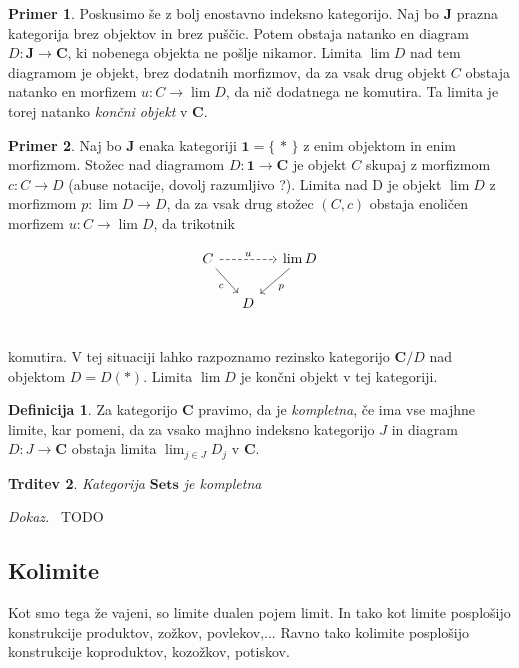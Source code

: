 \documentclass[12pt,a4paper]{book}
\theoremstyle{definition}
\newtheorem{definicija}{Definicija}[chapter]
\theoremstyle{plain}
\newtheorem{trditev}[definicija]{Trditev}
\newenvironment{dokaz}{\emph{Dokaz.}\ }{\hspace{\fill}{$\Box$}}
\theoremstyle{definition}
\newtheorem{primer}{Primer}[section]
\theoremstyle{remark}
\newcommand{\cat}[1]{\textbf{#1}}
\renewcommand{\set}[1]{\{\,#1\,\}}
\begin{document}
\begin{primer}
Poskusimo še z bolj enostavno indeksno kategorijo. Naj bo $\cat{J}$ prazna kategorija brez objektov in brez puščic. Potem obstaja natanko en diagram $D : \cat{J} \to \cat{C}$, ki nobenega objekta ne pošlje nikamor. Limita $\lim D$ nad tem diagramom je objekt, brez dodatnih morfizmov, da za vsak drug objekt $C$ obstaja natanko en morfizem $u : C \to \lim D$, da nič dodatnega ne komutira. Ta limita je torej natanko \textit{končni objekt} v $\cat{C}$.
\end{primer}

\begin{primer}
Naj bo $\cat{J}$ enaka kategoriji $\cat{1} = \set{\ast}$ z enim objektom in enim morfizmom. Stožec nad diagramom $D : \cat{1} \to \cat{C}$ je objekt $C$ skupaj z morfizmom $c : C \to D$ (abuse notacije, dovolj razumljivo ?). Limita nad D je objekt $\lim D$ z morfizmom $p : \lim D \to D$, da za vsak drug stožec $(C, c)$ obstaja enoličen morfizem $u : C \to \lim D$, da trikotnik

$$\begin{tikzcd}[column sep=small]
C \ar[dr, "c"'] \ar[rr, dashed, "u"] & & \lim D \ar[dl, "p"] \\
& D & \\
\end{tikzcd}$$
komutira. V tej situaciji lahko razpoznamo rezinsko kategorijo $\cat{C}/D$ nad objektom $D = D(\ast)$. Limita $\lim D$ je končni objekt v tej kategoriji.
\end{primer}

\begin{definicija}
Za kategorijo $\cat{C}$ pravimo, da je \emph{kompletna}, če ima vse majhne limite, kar pomeni, da za vsako majhno indeksno kategorijo $J$ in diagram $D : J \to \cat{C}$ obstaja limita $\lim_{j \in J} D_j$ v $\cat{C}$.
\end{definicija}

\begin{trditev}
Kategorija $\cat{Sets}$ je kompletna
\end{trditev}
\begin{dokaz}
TODO
\end{dokaz}

\subsection{Kolimite}
Kot smo tega že vajeni, so limite dualen pojem limit. In tako kot limite posplošijo konstrukcije produktov, zožkov, povlekov,... Ravno tako kolimite posplošijo konstrukcije koproduktov, kozožkov, potiskov.
\end{document}
